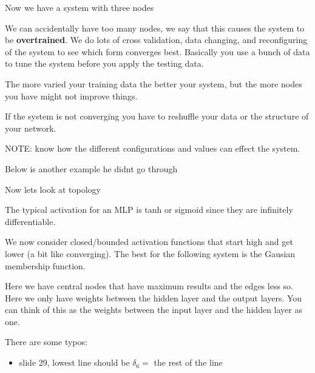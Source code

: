 \documentclass{article}
\begin{document}
Now we have a system with three nodes

We can accidentally have too many nodes, we say that this causes the system to be \textbf{overtrained}. We do lots of cross validation, data changing, and reconfiguring of the system to see which form converges best. Basically you use a bunch of data to tune the system before you apply the testing data.

The more varied your training data the better your system, but the more nodes you have might not improve things.



If the system is not converging you have to reshuffle your data or the structure of your network.

NOTE: know how the different configurations and values can effect the system.

Below is another example he didnt go through


Now lets look at topology

The typical activation for an MLP is tanh or sigmoid since they are infinitely differentiable.

We now consider closed/bounded activation functions that start high and get lower (a bit like converging). The best for the following system is the Gausian membership function.


Here we have central nodes that have maximum results and the edges less so. Here we only have weights between the hidden layer and the output layers. You can think of this as the weights between the input layer and the hidden layer as one.






There are some typos:
\begin{itemize}
	\item slide 29, lowest line should be $\delta_6 = $ the rest of the line
\end{itemize}
\end{document}
